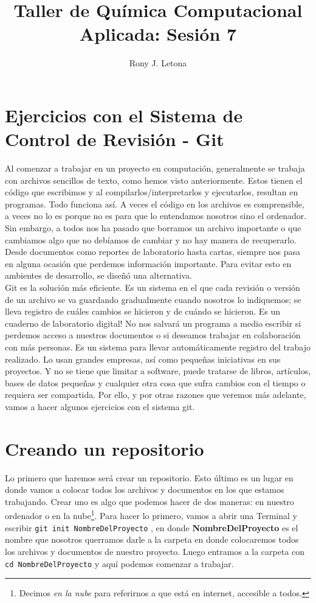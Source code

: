 \documentclass[10pt,letterpaper]{article}
\author{Rony J. Letona}
\title{Taller de Qu\'imica Computacional Aplicada: Sesi\'on 7}
\newcommand{\inlinecode}[1]{
\colorbox{light-gray}{\texttt{#1}}
}
\begin{document}
\maketitle

\section{Ejercicios con el Sistema de Control de Revisi\'on - Git}
Al comenzar a trabajar en un proyecto en computaci\'on, generalmente se trabaja con archivos sencillos de texto, como hemos visto anteriormente. Estos tienen el c\'odigo que escribimos y al compilarlos/interpretarlos y ejecutarlos, resultan en programas. Todo funciona as\'i. A veces el c\'odigo en los archivos es comprensible, a veces no lo es porque no es para que lo entendamos nosotros sino el ordenador. Sin embargo, a todos nos ha pasado que borramos un archivo importante o que cambiamos algo que no deb\'iamos de cambiar y no hay manera de recuperarlo. Desde documentos como reportes de laboratorio hasta cartas, siempre nos pasa en alguna ocasi\'on que perdemos informaci\'on importante. Para evitar esto en ambientes de desarrollo, se dise\~n\'o una alternativa.\\

Git es la soluci\'on m\'as eficiente. Es un sistema en el que cada revisi\'on o versi\'on de un archivo se va guardando gradualmente cuando nosotros lo indiquemos; se lleva registro de cu\'ales cambios se hicieron y de cu\'ando se hicieron. Es un cuaderno de laboratorio digital! No nos salvar\'a un programa a medio escribir si perdemos acceso a nuestros documentos o si deseamos trabajar en colaboraci\'on con m\'as personas. Es un sistema para llevar autom\'aticamente registro del trabajo realizado. Lo usan grandes empresas, as\'i como peque\~nas iniciativas en sus proyectos. Y no se tiene que limitar a software, puede tratarse de libros, art\'iculos, bases de datos peque\~nas y cualquier otra cosa que sufra cambios con el tiempo o requiera ser compartida. Por ello, y por otras razones que veremos m\'as adelante, vamos a hacer algunos ejercicios con el sistema git.

\section{Creando un repositorio}
Lo primero que haremos ser\'a crear un repositorio. Esto \'ultimo es un lugar en donde vamos a colocar todos los archivos y documentos en los que estamos trabajando. Crear uno es algo que podemos hacer de dos maneras: en nuestro ordenador o en la nube\footnote{Decimos \emph{en la nube} para referirnos a que est\'a en internet, accesible a todos.}. Para hacer lo primero, vamos a abrir una Terminal y escribir \inlinecode{git init NombreDelProyecto}, en donde \textbf{NombreDelProyecto} es el nombre que nosotros querramos darle a la carpeta en donde colocaremos todos los archivos y documentos de nuestro proyecto. Luego entramos a la carpeta con \inlinecode{cd NombreDelProyecto} y aqu\'i podemos comenzar a trabajar.\\
\end{document}

